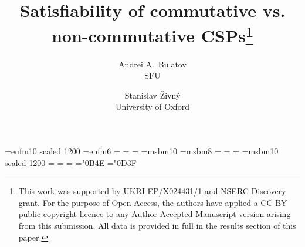 \documentclass[11pt,letter]{article}
\begin{document}
\def\lb{$\linebreak$}  
  
\def\ar{\hbox{ar}} 
\def\Im{{\sf Im}\;} 
\def\deg{{\sf deg}}
\def\id{{\rm id}}
  
\let\al=\alpha 
\let\gm=\gamma 
\let\dl=\delta 
\let\ve=\varepsilon
\let\ld=\lambda 
\let\om=\omega 
\let\vf=\varphi 
\let\vr=\varrho
\let\th=\theta 
\let\sg=\sigma 
\let\Gm=\Gamma 
\let\Dl=\Delta
  


\font\tengoth=eufm10 scaled 1200 
\font\sixgoth=eufm6
\def\goth{\fam12} 
=\tengoth 
{}=\sixgoth
{}=\sixgoth 
\font\tenbur=msbm10
\font\eightbur=msbm8 
\def\bur{\fam13} 
=\tenbur
{}=\eightbur 
{}=\eightbur
\font\twelvebur=msbm10 scaled 1200 
=\twelvebur
{}=\tenbur 
{}=\eightbur
\mathchardef\nat="0B4E 
\mathchardef\eps="0D3F

\newcommand{\infin}[1]{}

\newcommand{\Mnote}[1]{\todo[size=footnotesize,bordercolor=black,color=blue!40]{#1}}
\newcommand{\snote}[1]{\textcolor{blue!40}{(Standa: #1)}}
\newcommand{\anote}[1]{\textcolor{red}{(Andrei: #1)}}

\def\bZ{{\bf Z}}
\newcommand{\ignore}[1]{}
 
\title{Satisfiability of commutative vs. non-commutative CSPs\thanks{This work was supported by UKRI EP/X024431/1 and NSERC Discovery grant. For the purpose of Open Access, the authors have applied a CC BY public copyright licence to any Author Accepted Manuscript version arising from this submission. All data is provided in full in the results section of this paper.}}
\author{Andrei A.\ Bulatov\\SFU \and Stanislav \v{Z}ivn\'y\\University of Oxford} 
\date{} 
\maketitle
\end{document}
